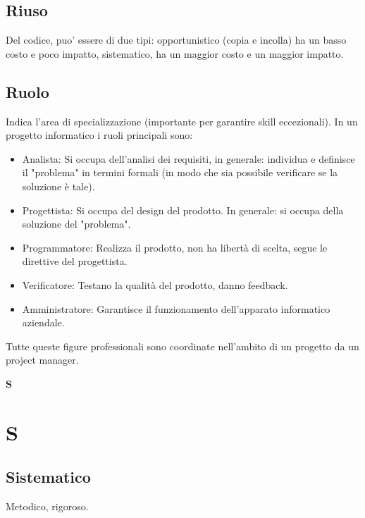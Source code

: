 	\subsection{Riuso}
	\label{sec:riuso}
	Del codice, puo' essere di due tipi: opportunistico (copia e incolla) ha un basso costo e poco impatto, sistematico, ha un maggior costo e un maggior impatto.		

	\subsection{Ruolo}
	\label{sec:ruolo}
	Indica l'area di specializzazione (importante per garantire skill eccezionali).
	In un progetto informatico i ruoli principali sono:
	\begin{itemize}  
	\item Analista: Si occupa dell'analisi dei requisiti, in generale: individua e definisce il "problema" in termini formali (in modo che sia possibile verificare se la soluzione è tale). 
	\item Progettista: Si occupa del design del prodotto. In generale: si occupa della soluzione del "problema".
	\item Programmatore: Realizza il prodotto, non ha libertà di scelta, segue le direttive del progettista.
	\item Verificatore: Testano la qualità del prodotto, danno feedback.
	\item Amministratore: Garantisce il funzionamento dell'apparato informatico aziendale. 
	\end{itemize}
	Tutte queste figure professionali sono coordinate nell'ambito di un progetto da un project manager.
	\newpage
	
	{\Huge{\textbf{S}}} \\
	\section{S}
	
	\subsection{Sistematico}
	\label{sec:sistematico}
	Metodico, rigoroso.

